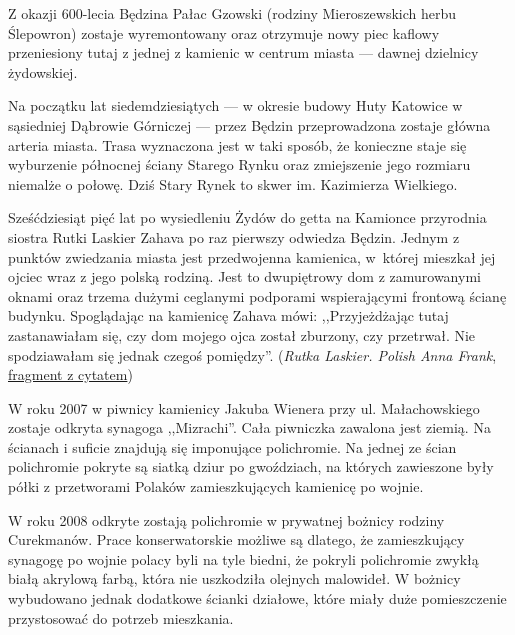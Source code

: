 \documentclass[11pt,a4paper,oneside]{article}
\begin{document}
Z okazji 600-lecia Będzina Pałac Gzowski (rodziny Mieroszewskich herbu
Ślepowron) zostaje wyremontowany oraz otrzymuje nowy piec kaflowy przeniesiony
tutaj z jednej z kamienic w centrum miasta --- dawnej dzielnicy żydowskiej.

Na początku lat siedemdziesiątych --- w okresie budowy Huty Katowice
w sąsiedniej Dąbrowie Górniczej --- przez Będzin przeprowadzona zostaje główna
arteria miasta. Trasa wyznaczona jest w taki sposób, że konieczne staje się
wyburzenie północnej ściany Starego Rynku oraz zmiejszenie jego rozmiaru
niemalże o połowę. Dziś Stary Rynek to skwer im.  Kazimierza Wielkiego.

Sześćdziesiąt pięć lat po wysiedleniu Żydów do getta na Kamionce przyrodnia
siostra Rutki Laskier Zahava po raz pierwszy odwiedza Będzin. Jednym z punktów
zwiedzania miasta jest przedwojenna kamienica, w~której mieszkał jej ojciec
wraz z jego polską rodziną. Jest to dwupiętrowy dom z zamurowanymi oknami oraz
trzema dużymi ceglanymi podporami wspierającymi frontową ścianę budynku.
Spoglądając na kamienicę Zahava mówi: ,,Przyjeżdżając tutaj zastanawiałam się,
czy dom mojego ojca został zburzony, czy przetrwał. Nie spodziawałam się jednak
czegoś pomiędzy''. (\emph{Rutka Laskier. Polish Anna Frank},
\href{http://www.youtube.com/watch?feature=player_detailpage&v=0e_UvEZtH_E#t=180s}{fragment
z cytatem})

W roku 2007 w piwnicy kamienicy Jakuba Wienera przy ul. Małachowskiego zostaje odkryta
synagoga ,,Mizrachi''. Cała piwniczka zawalona jest ziemią. Na ścianach i suficie
znajdują się imponujące polichromie. Na jednej ze ścian polichromie pokryte są
siatką dziur po gwoździach, na których zawieszone były półki z przetworami
Polaków zamieszkujących kamienicę po wojnie.

W roku 2008 odkryte zostają polichromie w prywatnej bożnicy rodziny Curekmanów.
Prace konserwatorskie możliwe są dlatego, że zamieszkujący synagogę po wojnie
polacy byli na tyle biedni, że pokryli polichromie zwykłą białą akrylową farbą,
która nie uszkodziła olejnych malowideł. W bożnicy wybudowano jednak dodatkowe
ścianki działowe, które miały duże pomieszczenie przystosować do potrzeb
mieszkania.
\end{document}
